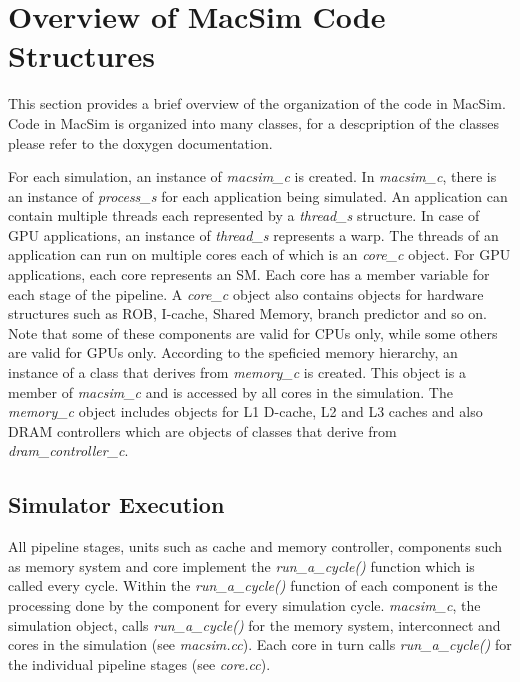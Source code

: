 
\chapter{Overview of MacSim Code Structures}
\label{sec:codetop}

This section provides a brief overview of the organization of the code in
MacSim. Code in MacSim is organized into many classes, for a descpription of
the classes please refer to the doxygen documentation.

For each simulation, an instance of \textit{macsim\_c} is created.  In
\textit{macsim\_c}, there is an instance of \textit{process\_s} for each
application being simulated. An application can contain multiple threads each
represented by a \textit{thread\_s} structure. In case of GPU applications, an
instance of \textit{thread\_s} represents a warp. The threads of an application
can run on multiple cores each of which is an \textit{core\_c} object. For GPU
applications, each core represents an SM. Each core has a member variable for
each stage of the pipeline.  A \textit{core\_c} object also contains objects
for hardware structures such as ROB, I-cache, Shared Memory, branch predictor
and so on. Note that some of these components are valid for CPUs only, while
some others are valid for GPUs only.  According to the speficied memory
hierarchy, an instance of a class that derives from \textit{memory\_c} is
created. This object is a member of \textit{macsim\_c} and is accessed by all
cores in the simulation. The \textit{memory\_c} object includes objects for L1
D-cache, L2 and L3 caches and also DRAM controllers which are objects of
classes that derive from \textit{dram\_controller\_c}. 


\section{Simulator Execution}

All pipeline stages, units such as cache and memory controller, components such
as memory system and core implement the \textit{run\_a\_cycle()} function which
is called every cycle. Within the \textit{run\_a\_cycle()} function of each
component is the processing done by the component for every simulation cycle.
\textit{macsim\_c}, the simulation object, calls \textit{run\_a\_cycle()} for
the memory system, interconnect and cores in the simulation (see
    \textit{macsim.cc}). Each core in turn calls \textit{run\_a\_cycle()} for
the individual pipeline stages (see \textit{core.cc}).



